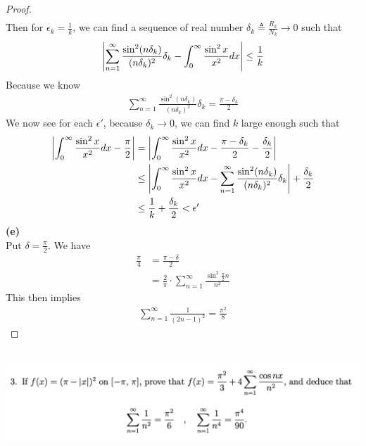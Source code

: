 \documentclass{report}
\begin{document}
\begin{proof}
\begin{align*}
\end{align*}
Then for $\epsilon_k=\frac{1}{k}$, we can find a sequence of real number $\delta_k\triangleq \frac{R_k}{N_k}\to 0$ such that 
\begin{align*}
\left|\sum_{n=1}^\infty \frac{\sin^2 (n\delta_k)}{(n\delta_k)^2}\delta_k -\int_0^\infty \frac{\sin^2 x}{x^2}dx\right|\leq \frac{1}{k}
\end{align*}
Because we know 
 \begin{align*}
\sum_{n=1}^\infty \frac{\sin^2 (n\delta_k)}{(n\delta_k)^2}\delta_k =\frac{\pi -\delta_k}{2}
\end{align*}
We now see for each $\epsilon '$, because $\delta_k \to 0$, we can find $k$ large enough such that  
\begin{align*}
  \left|\int_0^\infty \frac{\sin^2 x}{x^2}dx-\frac{\pi}{2}\right|&=\left|{\int_0^\infty \frac{\sin^2 x}{x^2}dx- \frac{\pi-\delta_k}{2}- \frac{\delta_k}{2}}\right|\\
  &\leq \left|\int_0^\infty \frac{\sin^2 x}{x^2}dx- \sum_{n=1}^{\infty} \frac{\sin^2 (n\delta_k)}{(n\delta_k)^2}\delta_k\right|+ \frac{\delta_k}{2}\\
  &\leq \frac{1}{k}+\frac{\delta_k}{2}<\epsilon ' 
\end{align*}
\textbf{(e)}\\

Put $\delta=\frac{\pi}{2}$. We have
\begin{align*}
\frac{\pi}{4}&=\frac{\pi-\delta}{2}\\
&=\frac{2}{\pi}\cdot\sum_{n=1}^\infty \frac{\sin^2 \frac{\pi}{2}n}{n^2}
\end{align*}
This then implies 
\begin{align*}
\sum_{n=1}^\infty \frac{1}{(2n-1)^2}=\frac{\pi^2}{8}
\end{align*}

\end{proof}
\begin{question}{}{}
\includegraphics[height=4cm,width=18cm]{ahw29}
\end{question}
\end{document}
